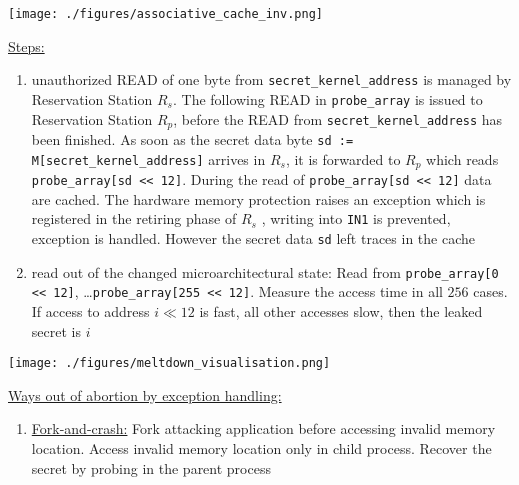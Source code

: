 \documentclass[landscape, a4paper]{article}
\begin{document}
\begin{minipage}[t]{0.2\linewidth}
\begin{betterlist}
\begin{enumerate}
			\texttt{[image: ./figures/associative\_cache\_inv.png]}
		\end{enumerate}
		\item \underline{Steps:}
		\begin{enumerate}
			\item unauthorized READ of one byte from \verb|secret_kernel_address| is managed by Reservation Station $R_s$. The following READ in \verb|probe_array| is issued to Reservation Station $R_p$, before the READ from \verb|secret_kernel_address| has been finished. As soon as the secret data byte \verb|sd := M[secret_kernel_address]| arrives in $R_s$, it is forwarded to $R_p$ which reads \verb|probe_array[sd << 12]|. During the read of \verb|probe_array[sd << 12]| data are cached. The hardware memory protection raises an exception which is registered in the retiring phase of $R_s$ , writing into \verb|IN1| is prevented, exception is handled. However the secret data \verb|sd| left traces in the cache
			\item read out of the changed microarchitectural state: Read from \verb|probe_array[0 << 12]|, \ldots \verb|probe_array[255 << 12]|. Measure the access time in all $256$ cases. If access to address $i \ll 12$ is fast, all other accesses slow, then the leaked secret is $i$
		\end{enumerate}
		\texttt{[image: ./figures/meltdown\_visualisation.png]}
		\item \underline{Ways out of abortion by exception handling:}
		\begin{enumerate}
			\item \underline{Fork-and-crash:} Fork attacking application before accessing invalid memory location. Access invalid memory location only in child process. Recover the secret by probing in the parent process

\end{enumerate}
\end{betterlist}
\end{minipage}
\end{document}
